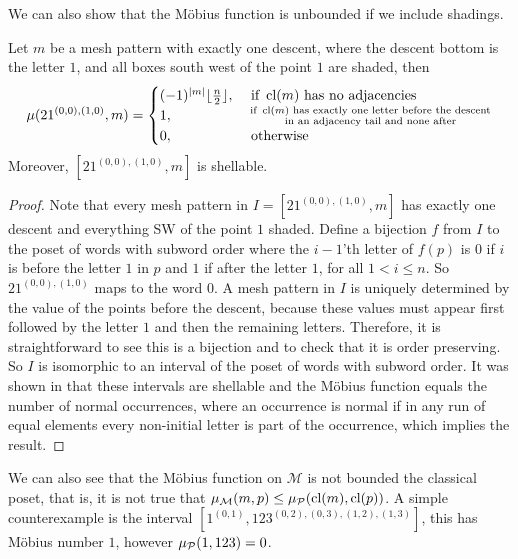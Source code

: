 \documentclass[11pt,a4paper,oneside]{article}
\begin{document}
We can also show that the M\"obius function is unbounded if we include shadings.
\begin{lem}\label{lem:mobUn}
Let $m$ be a mesh pattern with exactly one descent, where the descent bottom is the letter $1$, and all boxes south west of the point $1$ are shaded, then $$\mu(21^{(0,0),(1,0)},m)=\begin{cases}
(-1)^{|m|}\lfloor\frac{n}{2}\rfloor,&\mbox{ if } \operatorname{\textrm{cl}}(m) \mbox{ has no adjacencies}\\
1,&\substack{ \text{ if } \operatorname{\textrm{cl}}(m) \text{ has exactly one letter before the descent} \\\text{ in an adjacency tail and none after}}\\
0, &\mbox{ otherwise}
\end{cases}$$
Moreover, $[21^{(0,0),(1,0)},m]$ is shellable.
\begin{proof}
Note that every mesh pattern in $I=[21^{(0,0),(1,0)},m]$ has exactly one descent and everything SW of the point $1$ shaded. Define a bijection $f$ from $I$ to the poset of words with subword order where the $i-1$'th letter of $f(p)$ is $0$ if $i$ is before the letter $1$ in $p$ and $1$ if after the letter $1$, for all $1<i\le n$. So $21^{(0,0),(1,0)}$ maps to the word $0$. A mesh pattern in $I$ is uniquely determined by the value of the points before the descent, because these values must appear first followed by the letter $1$ and then the remaining letters. Therefore, it is straightforward to see this is a bijection and to check that it is order preserving. So $I$ is isomorphic to an interval of the poset of words with subword order. It was shown in \cite{Bjo90} that these intervals are shellable and the M\"obius function equals the number of normal occurrences, where an occurrence is normal if in any run of equal elements every non-initial letter is part of the occurrence, which implies the result.
\end{proof}
\end{lem}

We can also see that the M\"obius function on $\mathcal{M}$ is not bounded the classical poset, that is, it is not true that $\operatorname{\mu_\mathcal{M}}(m,p)\le \operatorname{\mu_\mathcal{P}}(\operatorname{\textrm{cl}}(m),\operatorname{\textrm{cl}}(p))$. A simple counterexample is the interval $[1^{(0,1)},123^{(0,2),(0,3),(1,2),(1,3)}]$, this has M\"obius number $1$, however $\operatorname{\mu_\mathcal{P}}(1,123)=0$.
\end{document}
